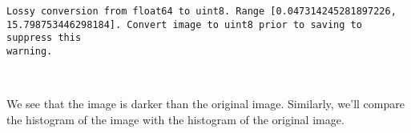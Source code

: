 \documentclass[11pt]{article}
\begin{document}
    \begin{Verbatim}[commandchars=\\\{\}]
Lossy conversion from float64 to uint8. Range [0.047314245281897226,
15.798753446298184]. Convert image to uint8 prior to saving to suppress this
warning.
    \end{Verbatim}

    \begin{center}
    \end{center}
    { \hspace*{\fill} \\}
    
    We see that the image is darker than the original image. Similarly,
we'll compare the histogram of the image with the histogram of the
original image.
\end{document}
